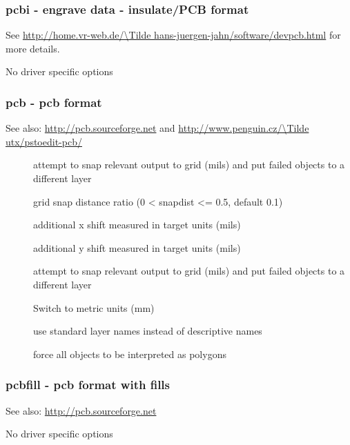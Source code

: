 \documentclass[english,a4paper]{article}
\let\URL\url \let\Email\url \let\File\url
\begin{document}
\subsubsection{pcbi - engrave data - insulate/PCB format}
See \URL{http://home.vr-web.de/\Tilde hans-juergen-jahn/software/devpcb.html} for more details.

No driver specific options
\subsubsection{pcb - pcb format}
See also: \URL{http://pcb.sourceforge.net} and \URL{http://www.penguin.cz/\Tilde utx/pstoedit-pcb/} 

\begin{description}
\item[] 
attempt to snap relevant output to grid (mils) and put failed objects to a different layer


\item[] 
grid snap distance ratio (0 < snapdist <= 0.5, default 0.1)


\item[] 
additional x shift measured in target units (mils)


\item[] 
additional y shift measured in target units (mils)


\item[] 
attempt to snap relevant output to grid (mils) and put failed objects to a different layer


\item[] 
Switch to metric units (mm)


\item[] 
use standard layer names instead of descriptive names


\item[] 
force all objects to be interpreted as polygons


\end{description}
\subsubsection{pcbfill - pcb format with fills}
See also: \URL{http://pcb.sourceforge.net} 

No driver specific options
\end{document}
